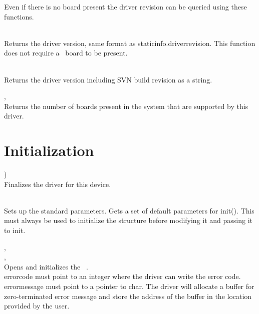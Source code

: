 	Even if there is no board present the driver revision can be queried using these functions.

	\\
	Returns the driver version, same format as \textsf{\prefix static\tu info.driver\tu revision}. 
	This function does not require a \deviceName\ board to be present.

	\\
	Returns the driver version including SVN build revision as a string. 

	, \label{countdevices}\\
	Returns the number of boards present in the system that are supported by this driver.\par


\section {Initialization}

		\device )\\
		Finalizes the driver for this device.

		\\
		Sets up the standard parameters. Gets a set of default parameters for \textsf{\prefix init()}. 
		This must always be used to initialize the \textsf{\initparameters} structure before modifying it 
		and passing it to \textsf{\prefix init}.\par

		, \\ 
		, \\
		Opens and initializes the \deviceName\ 
		. \\
		\textsf{error\tu code} must point to an integer where the driver can write the error code. \\
		\textsf{error\tu message} must point to a pointer to char. 
		The driver will allocate a buffer for zero-terminated error message and store the address of the buffer in the location provided by the user.\par

